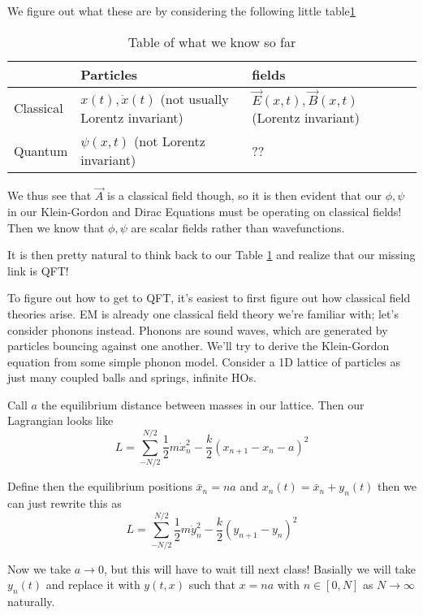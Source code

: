 \documentclass[10pt]{report}
\begin{document}
We figure out what these are by considering the following little table\ref{tab:5.21.organizetable}
\begin{table}
    \centering
    \begin{tabular}{l|l|l|}
        &Particles & fields\\[10pt]\hline
        Classical & $x(t), \dot{x}(t)$ (not usually Lorentz invariant) & $\vec{E}(x,t), \vec{B}(x,t)$ (Lorentz invariant)\\[10pt]\hline
        Quantum & $\psi(x,t)$ (not Lorentz invariant)& ??
    \end{tabular}
    \caption{Table of what we know so far}
    \label{tab:5.21.organizetable}
\end{table}

We thus see that $\vec{A}$ is a classical field though, so it is then evident that our $\phi, \psi$ in our Klein-Gordon and Dirac Equations must be operating on classical fields! Then we know that $\phi, \psi$ are scalar fields rather than wavefunctions. 

It is then pretty natural to think back to our Table \ref{tab:5.21.organizetable} and realize that our missing link is QFT!

To figure out how to get to QFT, it's easiest to first figure out how classical field theories arise. EM is already one classical field theory we're familiar with; let's consider phonons instead. Phonons are sound waves, which are generated by particles bouncing against one another. We'll try to derive the Klein-Gordon equation from some simple phonon model. Consider a 1D lattice of particles as just many coupled balls and springs, infinite HOs. 

Call $a$ the equilibrium distance between masses in our lattice. Then our Lagrangian looks like
\begin{equation}
    L = \sum\limits_{-N/2}^{N/2} \frac{1}{2}m\dot{x}_n^2 - \frac{k}{2}\left( x_{n+1} - x_n - a \right)^2
\end{equation}

Define then the equilibrium positions $\bar{x}_n = na$ and $x_n(t) = \bar{x}_n + y_n(t)$ then we can just rewrite this as 
\begin{equation}
    L = \sum\limits_{-N/2}^{N/2} \frac{1}{2}m\dot{y}_n^2 - \frac{k}{2}\left( y_{n+1} - y_n \right)^2
\end{equation}

Now we take $a \to 0$, but this will have to wait till next class! Basially we will take $y_n(t)$ and replace it with $y(t,x)$ such that $x = na$ with $n \in [0,N]$ as $N \to \infty$ naturally. 
\end{document}
